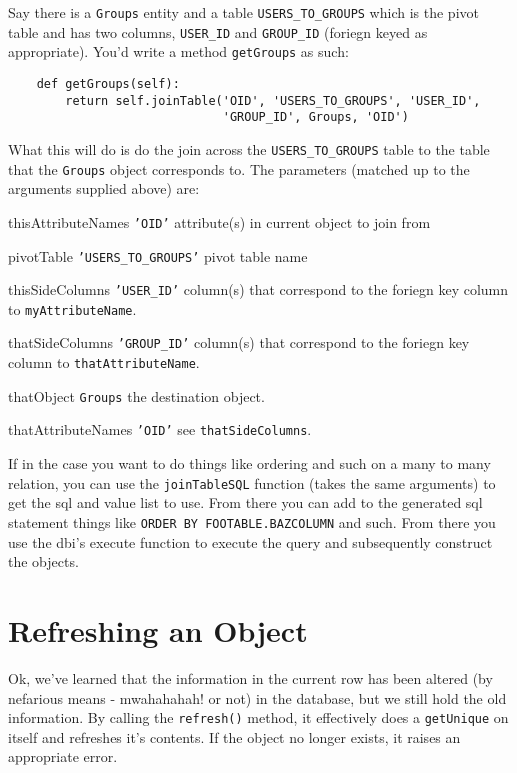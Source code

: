 \documentclass[titlepage]{manual}
\begin{document}
Say there is a \texttt{Groups} entity and a table
\texttt{USERS_TO_GROUPS} which is the pivot table and has two columns,
\texttt{USER_ID} and \texttt{GROUP_ID} (foriegn keyed as appropriate).
You'd write a method \texttt{getGroups} as such:
\begin{verbatim}
    def getGroups(self):
        return self.joinTable('OID', 'USERS_TO_GROUPS', 'USER_ID',
                              'GROUP_ID', Groups, 'OID')
\end{verbatim}

What this will do is do the join across the \texttt{USERS_TO_GROUPS}
table to the table that the \texttt{Groups} object corresponds to.
The parameters (matched up to the arguments supplied above) are:

\begin{argdesc}
\item[thisAttributeNames]  \texttt{'OID'} attribute(s) in current object to join from
\item[pivotTable] \texttt{'USERS_TO_GROUPS'} pivot table name
\item[thisSideColumns] \texttt{'USER_ID'} column(s) that correspond to
the foriegn key column to \texttt{myAttributeName}.
\item[thatSideColumns] \texttt{'GROUP_ID'} column(s) that correspond
to the foriegn key column to \texttt{thatAttributeName}.
\item[thatObject] \texttt{Groups} the destination object.
\item[thatAttributeNames] \texttt{'OID'} see \texttt{thatSideColumns}.
\end{argdesc}

If in the case you want to do things like ordering and such on a many
to many relation, you can use the \texttt{joinTableSQL} function
(takes the same arguments) to get the sql and value list to use.  From
there you can add to the generated sql statement things like
\texttt{ORDER BY FOOTABLE.BAZCOLUMN} and such.  From there you use the
dbi's execute function to execute the query and subsequently construct
the objects.

\section{Refreshing an Object}
Ok, we've learned that the information in the current row has been
altered (by nefarious means - mwahahahah!  or not) in the database,
but we still hold the old information.  By calling the
\texttt{refresh()} method, it effectively does a \texttt{getUnique} on
itself and refreshes it's contents.  If the object no longer exists,
it raises an appropriate error.
\end{document}
